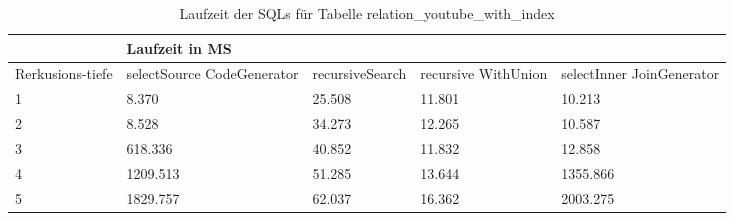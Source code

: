 \begin{table}[H]
	\centering
	\begin{tabular}{l|l|l|l|l|l|}
		\cline{2-6}
		& \multicolumn{5}{|l|}{Laufzeit in MS}                                                                                                                                                  \\ \hline
		\multicolumn{1}{|l|}{\multirow{2}{2cm}{Rerkusions-tiefe}} & \multicolumn{2}{|l|}{\multirow{2}{3cm}{selectSource CodeGenerator}} & \multirow{2}{2.8cm}{recursiveSearch} & \multirow{2}{2.5cm}{recursive WithUnion} & \multirow{2}{2.5cm}{selectInner JoinGenerator} \\
		\multicolumn{1}{|l|}{}
		& \multicolumn{2}{|l|}{}                                           &                                  &                                     &                                           \\ \hline
		
		\multicolumn{1}{|l|}{1}                                 & \multicolumn{2}{l|}{8.370}                                       & 25.508                                                & 11.801                                                    & 10.213                                                          \\ \hline
		\multicolumn{1}{|l|}{2}                                 & \multicolumn{2}{l|}{8.528}                                       & 34.273                                                & 12.265                                                    & 10.587                                                          \\ \hline
		\multicolumn{1}{|l|}{3}                                 & \multicolumn{2}{l|}{618.336}                                     & 40.852                                                & 11.832                                                    & 12.858                                                          \\ \hline
		\multicolumn{1}{|l|}{4}                                 & \multicolumn{2}{l|}{1209.513}                                    & 51.285                                                & 13.644                                                    & 1355.866                                                        \\ \hline
		\multicolumn{1}{|l|}{5}                                 & \multicolumn{2}{l|}{1829.757}                                    & 62.037                                                & 16.362                                                    & 2003.275                                                        \\ \hline
		
		
	\end{tabular}
	\caption{Laufzeit der SQLs für Tabelle relation\_youtube\_with\_index}
\end{table}



